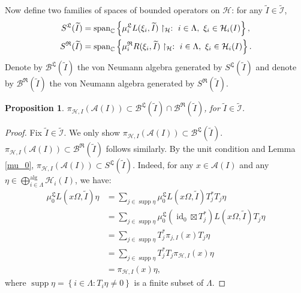 \documentclass{article}
\newtheorem{proposition}{Proposition}
\newcommand{\hilb}{\mathcal{H}}
\newcommand{\B}{\mathcal{B}}
\newcommand{\C}{\mathbb{C}}
\newcommand{\A}{\mathcal{A}}
\begin{document}
Now define two families of spaces of bounded operators on $\hilb$: for any $\widetilde{I} \in \widetilde{\mathcal{I}}$,
\begin{align}{\label{defining}}
    S^{\mathfrak{L}}(\widetilde{I}) &= \operatorname{span}_\C\left\{  \mu_i^{\mathfrak{L}}L(\xi_i,\widetilde{I})\restriction_{\hilb}:\ i\in\Lambda,\  \xi_i\in\hilb_i(I) \right\}, \\
    S^{\mathfrak{R}}(\widetilde{I}) &=  \operatorname{span}_\C\left\{  \mu_i^{\mathfrak{R}}R(\xi_i,\widetilde{I})\restriction_{\hilb}:\ i\in\Lambda,\  \xi_i\in\hilb_i(I) \right\}. 
\end{align}
Denote by $\B^{\mathfrak{L}}(\widetilde{I})$ the von Neumann algebra generated by $S^{\mathfrak{L}}(\widetilde{I})$ and denote by $\B^{\mathfrak{R}}(\widetilde{I})$ the von Neumann algebra generated by
$S^{\mathfrak{R}}(\widetilde{I}).$

\begin{proposition}\label{inclusion}
    $\pi_{\hilb,I}\left(\A(I)\right)\subset \B^{\mathfrak{L}}(\widetilde{I}) \cap \B^{\mathfrak{R}}(\widetilde{I})$, for $\widetilde{I}\in\widetilde{\mathcal{I}}$.
\end{proposition}
\begin{proof}
Fix $\widetilde{I} \in \widetilde{\mathcal{I}}$.  We only show  $\pi_{\hilb,I}\left(\A(I)\right)\subset \B^{\mathfrak{L}}(\widetilde{I})$. $\pi_{\hilb,I}\left(\A(I)\right) \subset \B^{\mathfrak{R}}(\widetilde{I})$ follows similarly. By the unit condition and Lemma \ref{mu_0},  $\pi_{\hilb,I}\left(\A(I)\right)\subset S^{\mathfrak{L}}(\widetilde{I})$. Indeed, for any $x\in\A(I)$ and any $\eta\in\bigoplus^{\operatorname{alg}}_{i\in\Lambda}\hilb_i(I)$, we have:
    \begin{align*}
        \mu_0^{\mathfrak{L}}L(x\Omega,\widetilde{I})\eta &= \sum_{j\in\operatorname{supp}\eta} \mu_0^{\mathfrak{L}} L(x\Omega,\widetilde{I})T_j^*T_j\eta \\
        &= \sum_{j\in\operatorname{supp}\eta}\mu_0^{\mathfrak{L}}(\operatorname{id}_0\boxtimes T_j^*)L(x\Omega,\widetilde{I})T_j\eta \\
        &= \sum_{j\in\operatorname{supp}\eta} T_j^* \pi_{j,I}(x)T_j\eta\\
        &= \sum_{j\in\operatorname{supp}\eta}T_j^*T_j\pi_{\hilb,I}(x)\eta\\
        & = \pi_{\hilb,I}(x)\eta, 
    \end{align*}
    where $\operatorname{supp}\eta = \left\{i\in\Lambda: T_i \eta \neq0 \right\}$  is a finite subset of $\Lambda$.
\end{proof}
\end{document}
